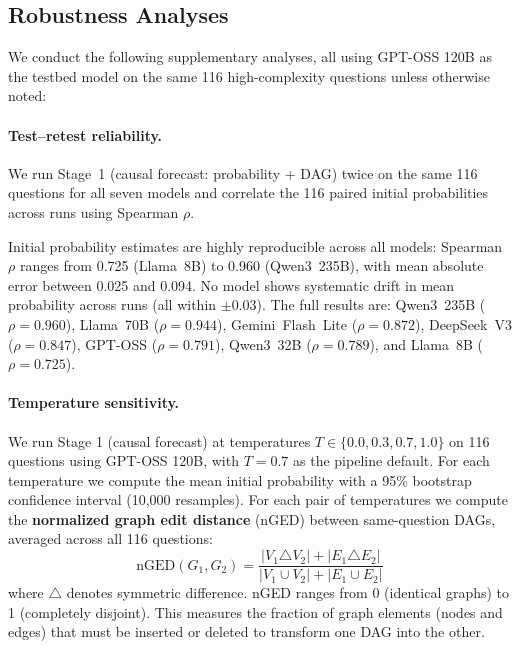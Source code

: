 \documentclass[11pt]{article}
\begin{document}
\subsection{Robustness Analyses}

We conduct the following supplementary analyses, all using GPT-OSS 120B as the testbed model on the same 116 high-complexity questions unless otherwise noted:

\paragraph{Test--retest reliability.} We run Stage~1 (causal forecast: probability + DAG) twice on the same 116 questions for all seven models and correlate the 116 paired initial probabilities across runs using Spearman $\rho$.

Initial probability estimates are highly reproducible across all models: Spearman $\rho$ ranges from 0.725 (Llama~8B) to 0.960 (Qwen3~235B), with mean absolute error between 0.025 and 0.094. No model shows systematic drift in mean probability across runs (all within $\pm$0.03). The full results are: Qwen3~235B ($\rho = 0.960$), Llama~70B ($\rho = 0.944$), Gemini~Flash~Lite ($\rho = 0.872$), DeepSeek~V3 ($\rho = 0.847$), GPT-OSS ($\rho = 0.791$), Qwen3~32B ($\rho = 0.789$), and Llama~8B ($\rho = 0.725$).

\paragraph{Temperature sensitivity.} We run Stage 1 (causal forecast) at temperatures $T \in \{0.0, 0.3, 0.7, 1.0\}$ on 116 questions using GPT-OSS 120B, with $T = 0.7$ as the pipeline default. For each temperature we compute the mean initial probability with a 95\% bootstrap confidence interval (10,000 resamples). For each pair of temperatures we compute the \textbf{normalized graph edit distance} (nGED) between same-question DAGs, averaged across all 116 questions:
\begin{equation}
    \text{nGED}(G_1, G_2) = \frac{|V_1 \triangle V_2| + |E_1 \triangle E_2|}{|V_1 \cup V_2| + |E_1 \cup E_2|}
\end{equation}
where $\triangle$ denotes symmetric difference. nGED ranges from 0 (identical graphs) to 1 (completely disjoint). This measures the fraction of graph elements (nodes and edges) that must be inserted or deleted to transform one DAG into the other.
\end{document}
